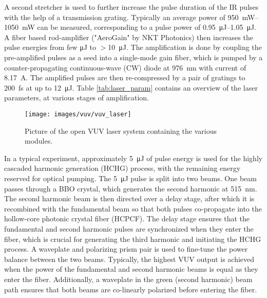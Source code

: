 A second stretcher is used to further increase the pulse duration of the IR pulses with the help of a transmission grating.
Typically an average power of \qtyrange{950}{1050}{\milli\watt} can be measured, corresponding to a pulse power of \qtyrange{0.95}{1.05}{\micro\joule}.
A fiber based rod-amplifier ("AeroGain" by NKT Photonics) then increases the pulse energies from few \unit{\micro\joule} to $>$\qty{10}{\micro\joule}.
The amplification is done by coupling the pre-amplified pulses as a seed into a single-mode gain fiber, which is pumped by a counter-propagating continuous-wave (CW) diode at \qty{976}{\nano\meter} with current of \qty{8.17}{\ampere}.
The amplified pulses are then re-compressed by a pair of gratings to \qty{200}{\femto\second} at up to \qty{12}{\micro\joule}.
Table \ref{tab:laser_param} contains an overview of the laser parameters, at various stages of amplification.

\begin{figure}
	\centering
	\texttt{[image: images/vuv/vuv\_laser]}
	\caption{Picture of the open VUV laser system containing the various modules.}
	\label{fig:vuvlaser}
\end{figure}

In a typical experiment, approximately \qty{5}{\micro\joule} of pulse energy is used for the highly cascaded harmonic generation (HCHG) process, with the remaining energy reserved for optical pumping.
The \qty{5}{\micro\joule} pulse is split into two beams.
One beam passes through a BBO crystal, which generates the second harmonic at \qty{515}{\nano\meter}.
The second harmonic beam is then directed over a delay stage, after which it is recombined with the fundamental beam so that both pulses co-propagate into the hollow-core photonic crystal fiber (HCPCF).
The delay stage ensures that the fundamental and second harmonic pulses are synchronized when they enter the fiber, which is crucial for generating the third harmonic and initiating the HCHG process.
A waveplate and polarizing prism pair is used to fine-tune the power balance between the two beams.
Typically, the highest VUV output is achieved when the power of the fundamental and second harmonic beams is equal as they enter the fiber.
Additionally, a waveplate in the green (second harmonic) beam path ensures that both beams are co-linearly polarized before entering the fiber.

